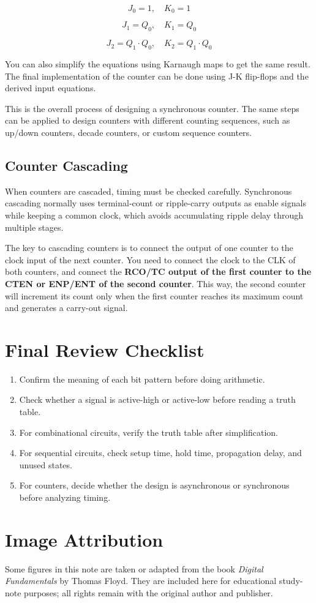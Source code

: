 \documentclass[11pt,a4paper]{article}
\providecommand{\tightlist}{\setlength{\itemsep}{1pt}\setlength{\parskip}{0pt}}
\begin{document}
\[J_0 = 1, \quad K_0 = 1\]

\[J_1 = Q_0, \quad K_1 = Q_0\]

\[J_2 = Q_1 \cdot Q_0, \quad K_2 = Q_1 \cdot Q_0\]

You can also simplify the equations using Karnaugh maps to get the same
result. The final implementation of the counter can be done using J-K
flip-flops and the derived input equations.

This is the overall process of designing a synchronous counter. The same
steps can be applied to design counters with different counting
sequences, such as up/down counters, decade counters, or custom sequence
counters.

\subsection{Counter Cascading}\label{counter-cascading}

When counters are cascaded, timing must be checked carefully.
Synchronous cascading normally uses terminal-count or ripple-carry
outputs as enable signals while keeping a common clock, which avoids
accumulating ripple delay through multiple stages.

The key to cascading counters is to connect the output of one counter to
the clock input of the next counter. You need to connect the clock to
the CLK of both counters, and connect the \textbf{RCO/TC output of the
first counter to the CTEN or ENP/ENT of the second counter}. This way,
the second counter will increment its count only when the first counter
reaches its maximum count and generates a carry-out signal.

\section{Final Review Checklist}\label{final-review-checklist}

\begin{enumerate}
\def\labelenumi{\arabic{enumi}.}
\tightlist
\item
  Confirm the meaning of each bit pattern before doing arithmetic.
\item
  Check whether a signal is active-high or active-low before reading a
  truth table.
\item
  For combinational circuits, verify the truth table after
  simplification.
\item
  For sequential circuits, check setup time, hold time, propagation
  delay, and unused states.
\item
  For counters, decide whether the design is asynchronous or synchronous
  before analyzing timing.
\end{enumerate}

\section{Image Attribution}\label{image-attribution}

Some figures in this note are taken or adapted from the book
\emph{Digital Fundamentals} by Thomas Floyd. They are included here for
educational study-note purposes; all rights remain with the original
author and publisher.
\end{document}
